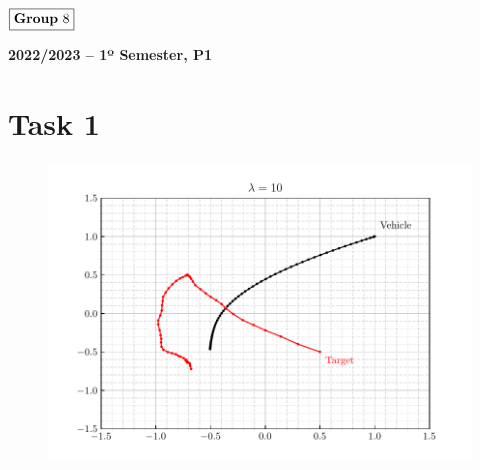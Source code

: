 \documentclass[12pt]{article}
\begin{document}
\begin{flushleft}
    \large $\boxed{\text{\bf Group} \ 8}$\\[4.0cm]
\end{flushleft}
    
\begin{center}
    \large \bf 2022/2023 -- 1º Semester, P1
\end{center}

\thispagestyle{empty}

\setcounter{page}{0}

\newpage

\tableofcontents 

\newpage

\section{Task 1}

\begin{figure}[H]
    \centering
    \includegraphics{../../src/task_1/output/ex_1_i=1.pdf}
\end{figure}
\end{document}
